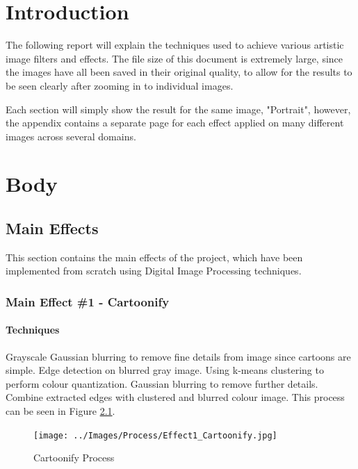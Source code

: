 \documentclass[a4paper,twoside,10pt, twocolumn]{report}
\begin{document}
	\tableofcontents
	\newpage
	\listoffigures
	\newpage


	\twocolumn
	\chapter{Introduction}
	The following report will explain the techniques used to achieve various artistic image filters and effects. The file size of this document is extremely large, since the images have all been saved in their original quality, to allow for the results to be seen clearly after zooming in to individual images.
	
	Each section will simply show the result for the same image, "Portrait", however, the appendix contains a separate page for each effect applied on many different images across several domains.
	
	
	\chapter{Body}
	
	\section{Main Effects}
	This section contains the main effects of the project, which have been implemented from scratch using Digital Image Processing techniques.
	\subsection{Main Effect \#1 - Cartoonify}
	\subsubsection{Techniques}
	Grayscale
	Gaussian blurring to remove fine details from image since cartoons are simple.
	Edge detection on blurred gray image.
	Using k-means clustering to perform colour quantization.
	Gaussian blurring to remove further details.
	Combine extracted edges with clustered and blurred colour image.
	This process can be seen in Figure \ref{Process_Cartoonify}.
	
	\begin{figure}[h]
		\caption{Cartoonify Process}
		\centering
		\texttt{[image: ../Images/Process/Effect1\_Cartoonify.jpg]}
		\label{Process_Cartoonify}
	\end{figure}
	
\end{document}
